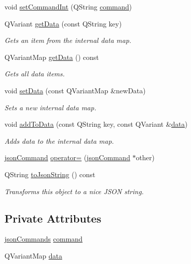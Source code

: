 \begin{DoxyCompactItemize}
\item 
void \hyperlink{class_k4_u_1_1json_command_af6610a609295d3aa428d46260a33e1de}{set\-Command\-Int} (Q\-String \hyperlink{class_k4_u_1_1json_command_ab78518e19fe664d54b9c4743a3521b04}{command})
\item 
Q\-Variant \hyperlink{class_k4_u_1_1json_command_ae829f45e11a50fa00024a5d9951cd748}{get\-Data} (const Q\-String key)
\begin{DoxyCompactList}\small\item\em Gets an item from the internal data map. \end{DoxyCompactList}\item 
Q\-Variant\-Map \hyperlink{class_k4_u_1_1json_command_ab408a8b051e005a7156e19ea8a1f7f3a}{get\-Data} () const 
\begin{DoxyCompactList}\small\item\em Gets all data items. \end{DoxyCompactList}\item 
void \hyperlink{class_k4_u_1_1json_command_aa5528a10032e013f668b3d33e02c37ed}{set\-Data} (const Q\-Variant\-Map \&new\-Data)
\begin{DoxyCompactList}\small\item\em Sets a new internal data map. \end{DoxyCompactList}\item 
void \hyperlink{class_k4_u_1_1json_command_aa0629328322fb09be4494a0826bb19b5}{add\-To\-Data} (const Q\-String key, const Q\-Variant \&\hyperlink{class_k4_u_1_1json_command_a56def41d467d060783b4c2b4f2178540}{data})
\begin{DoxyCompactList}\small\item\em Adds data to the internal data map. \end{DoxyCompactList}\item 
\hyperlink{class_k4_u_1_1json_command}{json\-Command} \hyperlink{class_k4_u_1_1json_command_a598c14a90fbdb237c0746070be2de591}{operator=} (\hyperlink{class_k4_u_1_1json_command}{json\-Command} $\ast$other)
\item 
Q\-String \hyperlink{class_k4_u_1_1json_command_a0b681a1fedfb2e89397b1f71e29edf78}{to\-Json\-String} () const 
\begin{DoxyCompactList}\small\item\em Transforms this object to a nice J\-S\-O\-N string. \end{DoxyCompactList}\end{DoxyCompactItemize}
\subsection*{Private Attributes}
\begin{DoxyCompactItemize}
\item 
\hyperlink{namespace_k4_u_a7edfadcc446c5a68af90f9aec6abd75e}{json\-Commands} \hyperlink{class_k4_u_1_1json_command_ab78518e19fe664d54b9c4743a3521b04}{command}
\item 
Q\-Variant\-Map \hyperlink{class_k4_u_1_1json_command_a56def41d467d060783b4c2b4f2178540}{data}
\end{DoxyCompactItemize}
